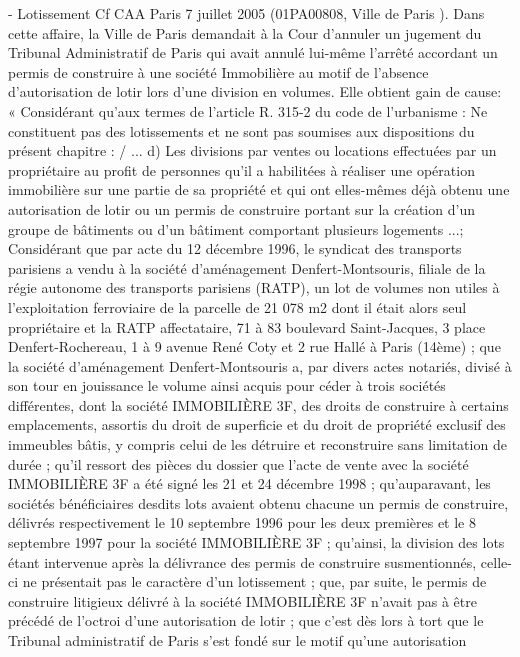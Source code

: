 \documentclass[11pt,a4paper]{report}
\begin{document}
	- Lotissement
	Cf CAA Paris 7 juillet 2005 (\no  01PA00808, Ville de Paris ). Dans cette affaire, la Ville de Paris demandait à la
	Cour d’annuler un jugement du Tribunal Administratif de Paris qui avait annulé lui-même l’arrêté accordant un
	permis de construire à une société Immobilière au motif de l’absence d’autorisation de lotir lors d’une division en
	volumes. Elle obtient gain de cause:
	« Considérant qu'aux termes de l'article R. 315-2 du code de l'urbanisme : Ne constituent pas des lotissements et
	ne sont pas soumises aux dispositions du présent chapitre : / ... d) Les divisions par ventes ou locations
	effectuées par un propriétaire au profit de personnes qu'il a habilitées à réaliser une opération immobilière sur
	une partie de sa propriété et qui ont elles-mêmes déjà obtenu une autorisation de lotir ou un permis de
	construire portant sur la création d'un groupe de bâtiments ou d'un bâtiment comportant plusieurs logements ...;
	Considérant que par acte du 12 décembre 1996, le syndicat des transports parisiens a vendu à la société
	d'aménagement Denfert-Montsouris, filiale de la régie autonome des transports parisiens (RATP), un lot de
	volumes non utiles à l'exploitation ferroviaire de la parcelle de 21 078 m2 dont il était alors seul propriétaire et la
	RATP affectataire, 71 à 83 boulevard Saint-Jacques, 3 place Denfert-Rochereau, 1 à 9 avenue René Coty et 2 rue
	Hallé à Paris (14ème) ; que la société d'aménagement Denfert-Montsouris a, par divers actes notariés, divisé à
	son tour en jouissance le volume ainsi acquis pour céder à trois sociétés différentes, dont la société
	IMMOBILIÈRE 3F, des droits de construire à certains emplacements, assortis du droit de superficie et du droit
	de propriété exclusif des immeubles bâtis, y compris celui de les détruire et reconstruire sans limitation de durée
	; qu'il ressort des pièces du dossier que l'acte de vente avec la société IMMOBILIÈRE 3F a été signé les 21 et 24
	décembre 1998 ; qu'auparavant, les sociétés bénéficiaires desdits lots avaient obtenu chacune un permis de
	construire, délivrés respectivement le 10 septembre 1996 pour les deux premières et le 8 septembre 1997 pour la
	société IMMOBILIÈRE 3F ; qu'ainsi, la division des lots étant intervenue après la délivrance des permis de
	construire susmentionnés, celle-ci ne présentait pas le caractère d'un lotissement ; que, par suite, le permis de
	construire litigieux délivré à la société IMMOBILIÈRE 3F n'avait pas à être précédé de l'octroi d'une autorisation
	de lotir ; que c'est dès lors à tort que le Tribunal administratif de Paris s'est fondé sur le motif qu'une autorisation
\end{document}
